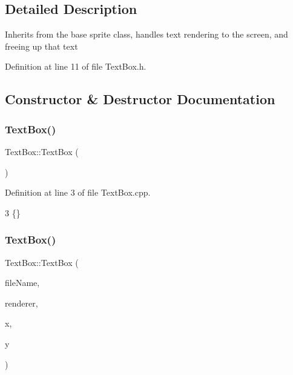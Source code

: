 \subsection{Detailed Description}
Inherit\textquotesingle{}s from the base sprite class, handles text rendering to the screen, and freeing up that text 

Definition at line 11 of file Text\+Box.\+h.



\subsection{Constructor \& Destructor Documentation}
\mbox{\label{class_text_box_a25b67e5ff6788c60b8aef3f3540879d0}} 
\subsubsection{\texorpdfstring{Text\+Box()}{TextBox()}\hspace{0.1cm}{\footnotesize\ttfamily [1/2]}}
{\footnotesize\ttfamily Text\+Box\+::\+Text\+Box (\begin{DoxyParamCaption}{ }\end{DoxyParamCaption})}



Definition at line 3 of file Text\+Box.\+cpp.


\begin{DoxyCode}
3 \{\}
\end{DoxyCode}
\mbox{\label{class_text_box_a7e80f260cc97085b70e838f0f4250697}} 
\subsubsection{\texorpdfstring{Text\+Box()}{TextBox()}\hspace{0.1cm}{\footnotesize\ttfamily [2/2]}}
{\footnotesize\ttfamily Text\+Box\+::\+Text\+Box (\begin{DoxyParamCaption}\item[{std\+::string}]{file\+Name,  }\item[{S\+D\+L\+\_\+\+Renderer $\ast$}]{renderer,  }\item[{int}]{x,  }\item[{int}]{y }\end{DoxyParamCaption})}



